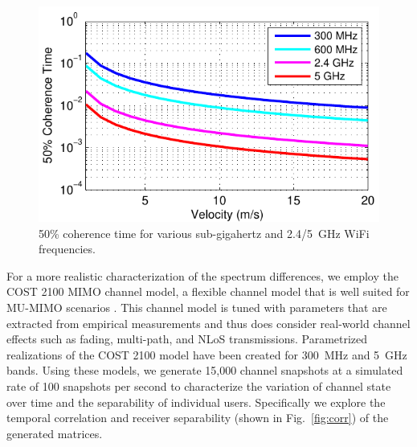 \begin{figure}[htbp!]
	\centering
  	\includegraphics[width=0.7\linewidth]{figs/doppler}   
    	\caption{50\% coherence time for various sub-gigahertz and 2.4/5~GHz WiFi frequencies.}
	\label{fig:doppler}
\end{figure}

	For a more realistic characterization of the spectrum differences, we employ the COST 2100 MIMO channel model, a flexible channel model that is well suited for \ac{MU-MIMO} scenarios \cite{liu2012cost}.
	This channel model is tuned with parameters that are extracted from empirical measurements and thus does consider real-world channel effects such as fading,  multi-path, and \ac{NLoS} transmissions.
	Parametrized realizations of the COST 2100 model have been created for 300~MHz \cite{zhu2013cost} and 5~GHz \cite{poutanen2011cost} bands.
	Using these models, we generate 15,000 channel snapshots at a simulated rate of 100 snapshots per second to characterize the variation of channel state over time and the separability of individual users. 
	Specifically we explore the temporal correlation  and receiver separability  (shown in Fig.~\ref{fig:corr}) of the generated matrices.

